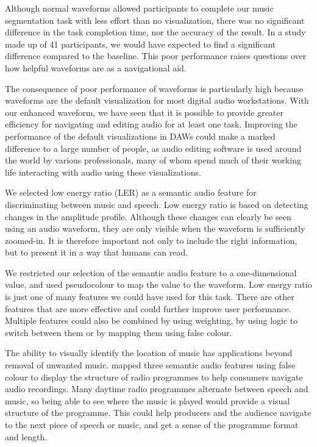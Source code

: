 Although normal waveforms allowed participants to complete our music segmentation task with less effort than no
visualization, there was no significant difference in the task completion time, nor the accuracy of the result.  In a
study made up of 41 participants, we would have expected to find a significant difference compared to the baseline.
This poor performance raises questions over how helpful waveforms are as a navigational aid.

The consequence of poor performance of waveforms is particularly high because waveforms are the default visualization
for most digital audio workstations. With our enhanced waveform, we have seen that it is possible to provide greater
efficiency for navigating and editing audio for at least one task.  Improving the performance of the default
visualizations in DAWs could make a marked difference to a large number of people, as audio editing software is
used around the world by various professionals, many of whom spend much of their working life interacting with audio
using these visualizations.

We selected low energy ratio (LER) as a semantic audio feature for discriminating between music and speech.  Low energy ratio
is based on detecting changes in the amplitude profile.  Although these changes can clearly be seen using an audio
waveform, they are only visible when the waveform is sufficiently zoomed-in.  It is therefore important not only to 
include the right information, but to present it in a way that humans can read.

We restricted our selection of the semantic audio feature to a one-dimensional value, and used pseudocolour to map the
value to the waveform.  Low energy ratio is just one of many features we could have used for this task.  There are
other features that are more effective and could further improve user performance. Multiple features could
also be combined by using weighting, by using logic to switch between them or by mapping them using false colour.

The ability to visually identify the location of music has applications beyond removal of unwanted music.
\citet{Mason2007} mapped three semantic audio features using false colour to display the structure of radio programmes
to help consumers navigate audio recordings.  Many daytime radio programmes alternate between speech and music, so
being able to see where the music is played would provide a visual structure of the programme. This could help
producers and the audience navigate to the next piece of speech or music, and get a sense of the programme format and
length.

